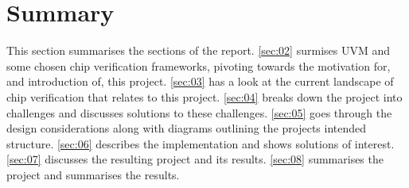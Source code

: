 \section{Summary}\label{sec:01}
This section summarises the sections of the report.\newline
\cref{sec:02} surmises UVM and some chosen chip verification frameworks, pivoting towards the motivation for, and introduction of, this project.\newline
\cref{sec:03} has a look at the current landscape of chip verification that relates to this project.\newline
\cref{sec:04} breaks down the project into challenges and discusses solutions to these challenges.\newline
\cref{sec:05} goes through the design considerations along with diagrams outlining the projects intended structure.\newline
\cref{sec:06} describes the implementation and shows solutions of interest.\newline
\cref{sec:07} discusses the resulting project and its results.\newline
\cref{sec:08} summarises the project and summarises the results.\newline